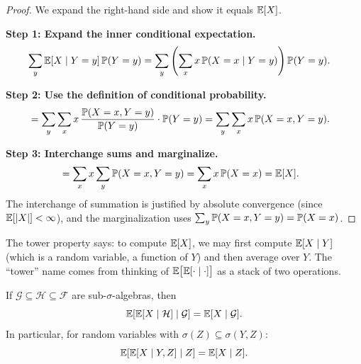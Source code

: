 \documentclass[11pt,a4paper]{article}
\begin{document}
\begin{proof}
We expand the right-hand side and show it equals $\mathbb{E}[X]$.

\textbf{Step 1: Expand the inner conditional expectation.}
\begin{align}
  \sum_y \mathbb{E}[X \mid Y = y]\, \mathbb{P}(Y = y)
  &= \sum_y \left(\sum_x x\,
    \mathbb{P}(X = x \mid Y = y)\right) \mathbb{P}(Y = y).
  \label{eq:tower_step1}
\end{align}

\textbf{Step 2: Use the definition of conditional probability.}
\begin{align}
  &= \sum_y \sum_x x\,
    \frac{\mathbb{P}(X = x, Y = y)}{\mathbb{P}(Y = y)} \cdot \mathbb{P}(Y = y)
  = \sum_y \sum_x x\, \mathbb{P}(X = x, Y = y).
  \label{eq:tower_step2}
\end{align}

\textbf{Step 3: Interchange sums and marginalize.}
\begin{align}
  &= \sum_x x \sum_y \mathbb{P}(X = x, Y = y)
  = \sum_x x\, \mathbb{P}(X = x) = \mathbb{E}[X].
  \label{eq:tower_step3}
\end{align}
The interchange of summation is justified by absolute convergence
(since $\mathbb{E}[|X|] < \infty$), and the marginalization uses
$\sum_y \mathbb{P}(X = x, Y = y) = \mathbb{P}(X = x)$.
\end{proof}

\begin{remark}[Interpretation]
The tower property says: to compute $\mathbb{E}[X]$, we may first
compute $\mathbb{E}[X \mid Y]$ (which is a random variable, a function
of $Y$) and then average over $Y$.  The ``tower'' name comes
from thinking of $\mathbb{E}\bigl[\mathbb{E}[\cdot \mid \cdot]\bigr]$ as a
stack of two operations.
\end{remark}

\begin{theorem}
\label{thm:tower_general}
If $\mathcal{G} \subseteq \mathcal{H} \subseteq \mathcal{F}$
are sub-$\sigma$-algebras, then
\begin{equation}
  \mathbb{E}\!\left[\mathbb{E}[X \mid \mathcal{H}]
    \;\middle|\; \mathcal{G}\right]
  = \mathbb{E}[X \mid \mathcal{G}].
  \label{eq:tower_general}
\end{equation}
In particular, for random variables with
$\sigma(Z) \subseteq \sigma(Y, Z)$:
\begin{equation}
  \mathbb{E}\!\left[\mathbb{E}[X \mid Y, Z] \;\middle|\; Z\right]
  = \mathbb{E}[X \mid Z].
  \label{eq:tower_yz}
\end{equation}
\end{theorem}
\end{document}
